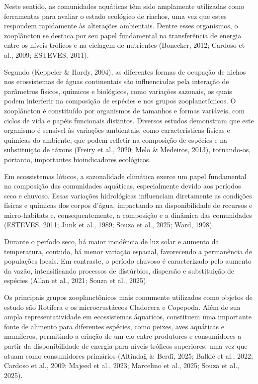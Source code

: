 \documentclass[
  letterpaper,
  DIV=11,
  numbers=noendperiod]{scrartcl}
\begin{document}
Neste sentido, as comunidades aquáticas têm sido amplamente utilizadas
como ferramentas para avaliar o estado ecológico de riachos, uma vez que
estes respondem rapidamente às alterações ambientais. Dentre esses
organismos, o zooplâncton se destaca por seu papel fundamental na
transferência de energia entre os níveis tróficos e na ciclagem de
nutrientes (Bonecker, 2012; Cardoso et al., 2009; ESTEVES, 2011).

Segundo (Keppeler \& Hardy, 2004), as diferentes formas de ocupação de
nichos nos ecossistemas de águas continentais são influenciadas pela
interação de parâmetros físicos, químicos e biológicos, como variações
sazonais, os quais podem interferir na composição de espécies e nos
grupos zooplanctônicos. O zooplâncton é constituído por organismos de
tamanhos e formas variáveis, com ciclos de vida e papéis funcionais
distintos. Diversos estudos demonstram que este organismo é sensível às
variações ambientais, como características físicas e químicas do
ambiente, que podem refletir na composição de espécies e na substituição
de táxons (Freiry et al., 2020; Melo \& Medeiros, 2013), tornando-os,
portanto, importantes bioindicadores ecológicos.

Em ecossistemas lóticos, a sazonalidade climática exerce um papel
fundamental na composição das comunidades aquáticas, especialmente
devido aos períodos seco e chuvoso. Essas variações hidrológicas
influenciam diretamente as condições físicas e químicas dos corpos
d'água, impactando na disponibilidade de recursos e micro-habitats e,
consequentemente, a composição e a dinâmica das comunidades (ESTEVES,
2011; Junk et al., 1989; Souza et al., 2025; Ward, 1998).

Durante o período seco, há maior incidência de luz solar e aumento da
temperatura, contudo, há menor variação espacial, favorecendo a
permanência de populações locais. Em contraste, o período chuvoso é
caracterizado pelo aumento da vazão, intensificando processos de
dístúrbios, dispersão e substituição de espécies (Allan et al., 2021;
Souza et al., 2025).

Os principais grupos zooplanctônicos mais comumente utilizados como
objetos de estudo são Rotifera e os microcrustáceos Cladocera e
Copepoda. Além de sua ampla representatividade em ecossistemas
áquaticos, constituem uma importante fonte de alimento para diferentes
espécies, como peixes, aves aquáticas e mamíferos, permitindo a criação
de um elo entre produtores e consumidores a partir da disponibilidade de
energia para níveis tróficos superiores, uma vez que atuam como
consumidores primários (Altindağ \& Berdi̇, 2025; Balkić et al., 2022;
Cardoso et al., 2009; Majeed et al., 2023; Marcelino et al., 2025; Souza
et al., 2025).
\end{document}
